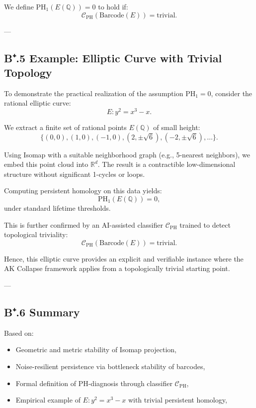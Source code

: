 \begin{definition}
We define \( \mathrm{PH}_1(E(\mathbb{Q})) = 0 \) to hold if:
\[
\mathcal{C}_{\mathrm{PH}}(\text{Barcode}(E)) = \text{trivial}.
\]
\end{definition}

---

\subsection*{B⁺.5 Example: Elliptic Curve with Trivial Topology}

To demonstrate the practical realization of the assumption \( \mathrm{PH}_1 = 0 \),  
consider the rational elliptic curve:
\[
E: y^2 = x^3 - x.
\]

We extract a finite set of rational points \( E(\mathbb{Q}) \) of small height:
\[
\{(0,0), (1,0), (-1,0), (2, \pm \sqrt{6}), (-2, \pm \sqrt{6}), \dots\}.
\]

Using Isomap with a suitable neighborhood graph (e.g., 5-nearest neighbors), we embed this point cloud into \( \mathbb{R}^d \).  
The result is a contractible low-dimensional structure without significant 1-cycles or loops.

Computing persistent homology on this data yields:
\[
\mathrm{PH}_1(E(\mathbb{Q})) = 0,
\]
under standard lifetime thresholds.  

This is further confirmed by an AI-assisted classifier \( \mathcal{C}_{\mathrm{PH}} \) trained to detect topological triviality:
\[
\mathcal{C}_{\mathrm{PH}}(\text{Barcode}(E)) = \text{trivial}.
\]

Hence, this elliptic curve provides an explicit and verifiable instance  
where the AK Collapse framework applies from a topologically trivial starting point.

---

\subsection*{B⁺.6 Summary}

Based on:
\begin{itemize}
  \item Geometric and metric stability of Isomap projection,
  \item Noise-resilient persistence via bottleneck stability of barcodes,
  \item Formal definition of PH-diagnosis through classifier \( \mathcal{C}_{\mathrm{PH}} \),
  \item Empirical example of \( E: y^2 = x^3 - x \) with trivial persistent homology,
\end{itemize}

